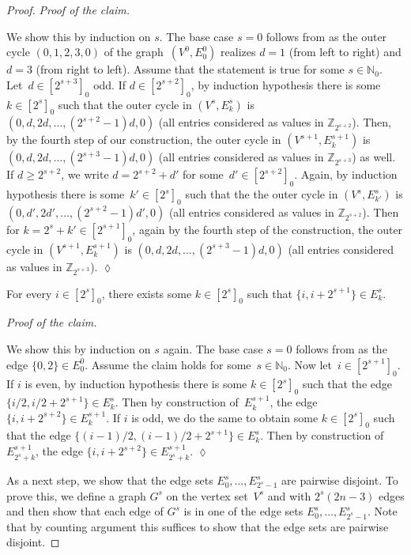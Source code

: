 \documentclass[unicode,runningheads,envcountsame,a4paper,dvipsnames,12pt]{llncs}
\providecommand{\qedsymbol}{\ensuremath{\square}}
\newenvironment{proofclaim}[1][Proof of the claim]{%
	\par\noindent\textit{#1.}\space\ignorespaces
	\renewcommand{\qedsymbol}{$\lozenge$}%
}{%
	\hfill\qedsymbol\par\medskip
}
\newcommand{\N}{\mathbb{N}}
\newcommand{\Z}{\mathbb{Z}}
\begin{document}
\begin{proof}
		\begin{proofclaim}
			We show this by induction on \(s\). The base case \(s=0\) follows from  as the outer cycle \((0,1,2,3,0)\) of the graph~\((V^0,E_0^0)\) realizes $d = 1$ (from left to right) and $d = 3$ (from right to left). Assume that the statement is true for some \(s \in \N_0\). Let~\(d \in [2^{s+3}]_0\) odd. If \(d \in [2^{s+2}]_0\), by induction hypothesis there is some \(k \in [2^s]_0\) such that the outer cycle in \((V^s,E_k^s)\) is~\((0,d,2d,\dots,(2^{s+2}-1)d,0)\) (all entries considered as values in \(\Z_{2^{s+2}}\)). Then, by the fourth step of our construction, the outer cycle in \((V^{s+1},E_k^{s+1})\) is~\((0,d,2d,\dots,(2^{s+3}-1)d,0)\) (all entries considered as values in \(\Z_{2^{s+3}}\)) as well. If \(d \geq 2^{s+2}\), we write \(d=2^{s+2}+d'\) for some~\(d' \in [2^{s+2}]_0\). Again, by induction hypothesis there is some~\(k' \in [2^s]_0\) such that the the outer cycle in \((V^s,E_{k'}^s)\) is \((0,d',2d',\dots,(2^{s+2}-1)d',0)\) (all entries considered as values in \(\Z_{2^{s+2}}\)). Then for \(k=2^s+k' \in [2^{s+1}]_0\), again by the fourth step of the construction, the outer cycle in \((V^{s+1},E_k^{s+1})\) is \((0,d,2d,\dots,(2^{s+3}-1)d,0)\) (all entries considered as values in \(\Z_{2^{s+3}}\)).
		\end{proofclaim}
		
		\begin{claim}
			For every \(i \in [2^s]_0\), there exists some \(k \in [2^s]_0 \) such that \(\{i,i+2^{s+1}\} \in E^{s}_k\).
			\label{claim:middle}
		\end{claim}
		
		\begin{proofclaim}
			We show this by induction on \(s\) again. The base case \(s=0\) follows from  as the edge \(\{0,2\} \in E_0^0\). Assume the claim holds for some~\(s \in \N_0\). Now let~\(i \in [2^{s+1}]_0\). If \(i\) is even, by induction hypothesis there is some \(k \in [2^s]_0 \) such that the edge \(\{i/2,i/2+2^{s+1}\} \in E^{s}_k\). Then by construction of~\(E^{s+1}_k\), the edge \(\{i,i+2^{s+2}\} \in E^{s+1}_k\).
			If \(i\) is odd, we do the same to obtain some \(k \in [2^s]_0 \) such that the edge \(\{(i-1)/2,(i-1)/2+2^{s+1}\} \in E^{s}_k\). Then by construction of \(E^{s+1}_{2^s+k}\), the edge \(\{i,i+2^{s+2}\} \in E^{s+1}_{2^s+k}\).
		\end{proofclaim}
		
		As a next step, we show that the edge sets \(E^s_0, \dots, E^{s}_{2^s-1}\) are pairwise disjoint. To prove this, we define a graph \(G^s\) on the vertex set~\(V^s\) and with \(2^s(2n-3)\) edges and then show that each edge of \(G^s\) is in one of the edge sets \(E^s_0, \dots, E^{s}_{2^s-1}\). Note that by counting argument this suffices to show that the edge sets are pairwise disjoint. 
		

\end{proof}
\end{document}
